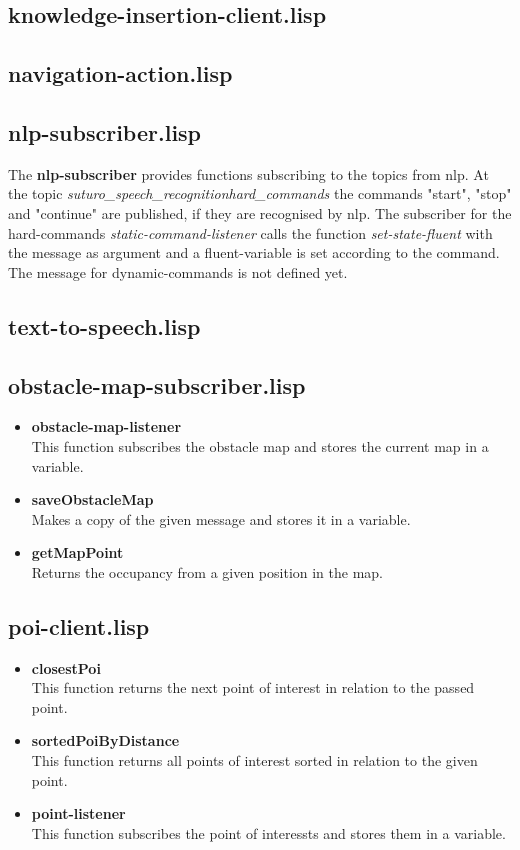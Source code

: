 \documentclass[main.tex]{subfiles}
\begin{document}
		\subsection{knowledge-insertion-client.lisp}
		\subsection{navigation-action.lisp}
		\subsection{nlp-subscriber.lisp}
		The \textbf{nlp-subscriber} provides functions subscribing to the topics from nlp. At the topic \textit{suturo\_speech\_recognition\/hard\_commands} the commands "start", "stop" and "continue" are published, if they are recognised by nlp. The subscriber for the hard-commands \textit{static-command-listener} calls the function \textit{set-state-fluent} with the message as argument and a fluent-variable is set according to the command. The message for dynamic-commands is not defined yet.
		\subsection{text-to-speech.lisp}
		\subsection{obstacle-map-subscriber.lisp}
	    \begin{itemize}
	    	\item \textbf{obstacle-map-listener} \\
	    	This function subscribes the obstacle map and stores the current map in a variable.
	    	\item \textbf{saveObstacleMap} \\
	    	Makes a copy of the given message and stores it in a variable.
	    	\item \textbf{getMapPoint} \\
	    	Returns the occupancy from a given position in the map.
	    \end{itemize}
		\subsection{poi-client.lisp}
 		\begin{itemize}
	    	\item \textbf{closestPoi} \\
	    	This function returns the next point of interest in relation to the passed point.
	    	\item \textbf{sortedPoiByDistance} \\
	    	This function returns all points of interest sorted in relation to the given point.
	    	\item \textbf{point-listener} \\
	    	This function subscribes the point of interessts and stores them in a variable.
	    \end{itemize}
\end{document}
